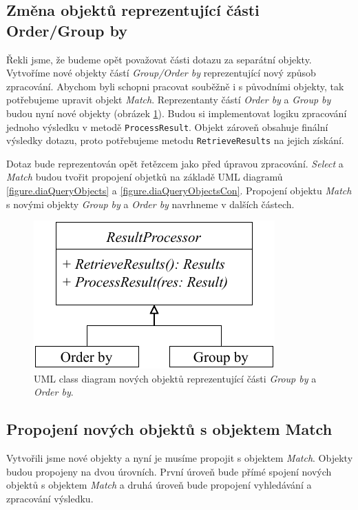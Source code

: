 \subsection{Změna objektů reprezentující části Order/Group by}

Řekli jsme, že budeme opět považovat části dotazu za separátní objekty.
Vytvoříme nové objekty částí \textit{Group/Order by} reprezentující nový způsob zpracování.
Abychom byli schopni pracovat souběžně i s původními objekty, tak potřebujeme upravit objekt \textit{Match}.
Reprezentanty částí \textit{Order by} a \textit{Group by} budou nyní nové objekty (obrázek \ref{figure.diaStreamedResultProcessor}).
Budou si implementovat logiku zpracování jednoho výsledku v metodě \texttt{ProcessResult}.
Objekt zároveň obsahuje finální výsledky dotazu, proto potřebujeme metodu \texttt{RetrieveResults} na jejich získání.

Dotaz bude reprezentován opět řetězcem jako před úpravou zpracování.
\textit{Select} a \textit{Match} budou tvořit propojení objetků na základě UML diagramů \ref{figure.diaQueryObjects} a \ref{figure.diaQueryObjectsCon}.
Propojení objektu \textit{Match} s novými objekty \textit{Group by} a \textit{Order by} navrhneme v dalších částech.

\begin{figure}[!htp]
\includegraphics{../img/diaStreamedResultProcessor.pdf}\centering
\caption{UML class diagram nových objektů reprezentující části \textit{Group by} a \textit{Order by}.}
\label{figure.diaStreamedResultProcessor}
\end{figure}

\subsection{Propojení nových objektů s objektem Match}

Vytvořili jsme nové objekty a nyní je musíme propojit s objektem \textit{Match}.
Objekty budou propojeny na dvou úrovních.
První úroveň bude přímé spojení nových objektů s objektem \textit{Match} a druhá úroveň bude propojení vyhledávání a zpracování výsledku.

